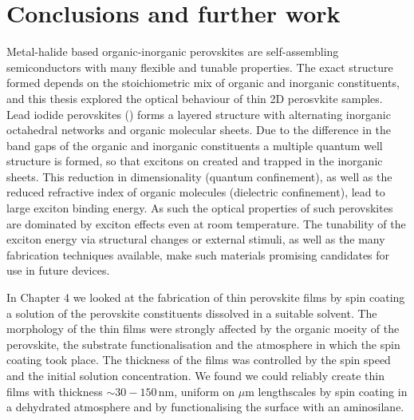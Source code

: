 
\chapter{Conclusions and further work}

\graphicspath{{Chapter8/Figures/}}

Metal-halide based organic-inorganic perovskites are self-assembling semiconductors with many flexible and tunable properties. The exact structure formed depends on the stoichiometric mix of organic and inorganic constituents, and this thesis explored the optical behaviour of thin 2D perosvkite samples. Lead iodide perovskites () forms a layered structure with alternating inorganic \ce{[PbI6]} octahedral networks and organic molecular sheets. Due to the difference in the band gaps of the organic and inorganic constituents a multiple quantum well structure is formed, so that excitons on created and trapped in the inorganic sheets. This reduction in dimensionality (quantum confinement), as well as the reduced refractive index of organic molecules (dielectric confinement), lead to large exciton binding energy. As such the optical properties of such perovskites are dominated by exciton effects even at room temperature. The tunability of the exciton energy via structural changes or external stimuli, as well as the many fabrication techniques available, make such materials promising candidates for use in future devices.

In Chapter 4 we looked at the fabrication of thin perovskite films by spin coating a solution of the perovskite constituents dissolved in a suitable solvent. The morphology of the thin films were strongly affected by the organic moeity of the perovskite, the substrate functionalisation and the atmosphere in which the spin coating took place. The thickness of the films was controlled by the spin speed and the initial solution concentration. We found we could reliably create thin films with thickness $\sim30-150$\,nm, uniform on $\mu$m lengthscales by spin coating in a dehydrated atmosphere and by functionalising the surface with an aminosilane.

